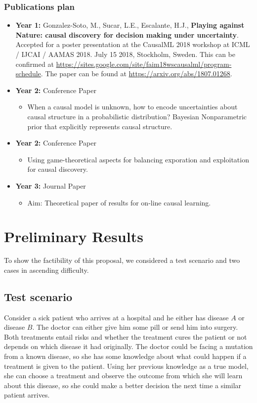 \documentclass[english,letterpaper,12pt,final]{article}
\theoremstyle{definition}
\begin{document}
\subsubsection{Publications plan}
\begin{itemize}
\item \textbf{Year 1:} Gonzalez-Soto, M., Sucar, L.E., Escalante, H.J., \textbf{Playing against Nature: causal discovery for decision making under uncertainty}. Accepted for a poster presentation at the CausalML 2018 workshop at ICML / IJCAI / AAMAS 2018. July 15 2018, Stockholm, Sweden. This can be confirmed at \url{https://sites.google.com/site/faim18wscausalml/program-schedule}. The paper can be found at \url{https://arxiv.org/abs/1807.01268}.
\item \textbf{Year 2:} Conference Paper
		\begin{itemize}
			\item When a causal model is unknown, how to encode uncertainties about causal structure in a probabilistic distribution? Bayesian Nonparametric prior that explicitly represents causal structure.
		\end{itemize}
\item \textbf{Year 2:} Conference Paper
	\begin{itemize}
		\item Using game-theoretical aspects for balancing exporation and exploitation for causal discovery. 
	\end{itemize}
\item \textbf{Year 3:} Journal Paper
		\begin{itemize}
			\item Aim: Theoretical paper of results for on-line causal learning.
		\end{itemize}
\end{itemize}

\newpage
\section{Preliminary Results}
To show the factibility of this proposal, we considered a test scenario and two cases in ascending difficulty.
\subsection{Test scenario}
Consider a sick patient who arrives at a hospital and he either has disease $A$ or disease $B$. The doctor can either give him some pill or send him into surgery.  Both treatments entail risks and whether the treatment cures the patient or not depends on which disease it had originally. The doctor could be facing a mutation from a known disease, so she has some knowledge about what could happen if a treatment is given to the patient. Using her previous knowledge as a true model, she can choose a treatment and observe the outcome from which she will learn about this disease, so she could make a better decision the next time a similar patient arrives.
\end{document}
